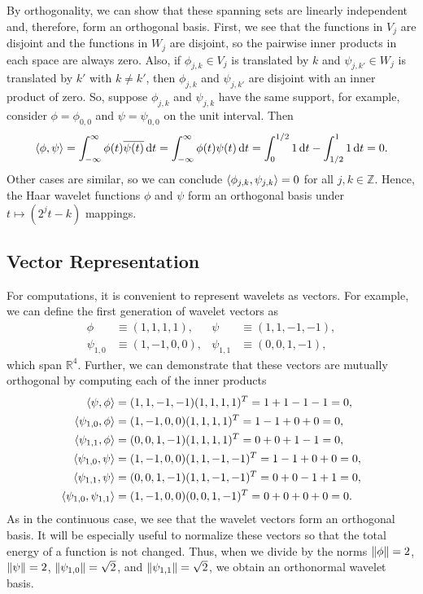 \documentclass{article}
\DeclarePairedDelimiter{\iprod}{\langle}{\rangle}
\def\ZZ{\mathbb{Z}}
\theoremstyle{definition}
\begin{document}
  By orthogonality, we can show that these spanning sets are linearly independent and, therefore, form an orthogonal basis. First, we see that the functions in \(V_j\) are disjoint and the functions in \(W_j\) are disjoint, so the pairwise inner products in each space are always zero. Also, if \(\phi_{j,k} \in V_j\) is translated by \(k\) and \(\psi_{j,k'} \in W_j\) is translated by \(k'\) with \(k \neq k'\), then \(\phi_{j,k}\) and \(\psi_{j,k'}\) are disjoint with an inner product of zero. So, suppose \(\phi_{j,k}\) and \(\psi_{j,k}\) have the same support, for example, consider \(\phi = \phi_{0,0}\) and \(\psi = \psi_{0,0}\) on the unit interval. Then
  \begin{equation*} \label{eqn:orthogonality-of-haar}
    \iprod{\phi,\psi}
      = \int_{-\infty}^\infty \phi(t) \overline{\psi(t)} \dd{t}
      = \int_{-\infty}^\infty \phi(t) \psi(t) \dd{t}
      = \int_{0}^{1/2}1 \dd{t} - \int_{1/2}^{1}1 \dd{t}
      = 0.
  \end{equation*}
  Other cases are similar, so we can conclude \(\iprod{\phi_{j,k},\psi_{j,k}} = 0\) for all \(j,k \in \ZZ\). Hence, the Haar wavelet functions \(\phi\) and \(\psi\) form an orthogonal basis under \(t \mapsto (2^jt-k)\) mappings.
  
  \subsection{Vector Representation}
  
  For computations, it is convenient to represent wavelets as vectors. For example, we can define the first generation of wavelet vectors as
  \begin{align*}
    \phi &\equiv (1,1,1,1), &
    \psi &\equiv (1,1,-1,-1), \\
    \psi_{1,0} &\equiv (1,-1,0,0), &
    \psi_{1,1} &\equiv (0,0,1,-1),
  \end{align*}
  which span \(\mathbb{R}^4\). Further, we can demonstrate that these vectors are mutually orthogonal by computing each of the inner products
  \begin{align*}
    \iprod{\psi, \phi} &=
    (1,1,-1,-1) (1,1,1,1)^T = 1+1-1-1 = 0, \\
    \iprod{\psi_{1,0}, \phi} &=
    (1,-1,0,0) (1,1,1,1)^T = 1-1+0+0 = 0, \\
    \iprod{\psi_{1,1}, \phi} &=
    (0,0,1,-1) (1,1,1,1)^T = 0+0+1-1 = 0, \\
    \iprod{\psi_{1,0}, \psi} &=
    (1,-1,0,0) (1,1,-1,-1)^T = 1-1+0+0 = 0, \\
    \iprod{\psi_{1,1}, \psi} &=
    (0,0,1,-1) (1,1,-1,-1)^T = 0+0-1+1 = 0, \\
    \iprod{\psi_{1,0}, \psi_{1,1}} &=
    (1,-1,0,0) (0,0,1,-1)^T = 0+0+0+0 = 0.
  \end{align*}
  As in the continuous case, we see that the wavelet vectors form an orthogonal basis. It will be especially useful to normalize these vectors so that the total energy of a function is not changed. Thus, when we divide by the norms \(\norm{\phi} = 2\), \(\norm{\psi} = 2\), \(\norm{\psi_{1,0}} = \sqrt{2}\), and \(\norm{\psi_{1,1}} = \sqrt{2}\), we obtain an orthonormal wavelet basis.
  
\end{document}
